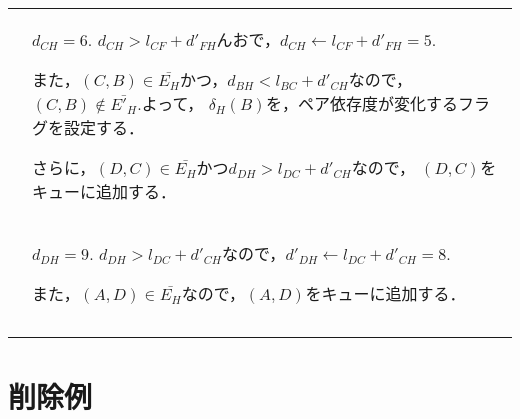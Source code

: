 \begin{tabular}{cp{8cm}}
  \\
  \raisebox{-.8\totalheight}{\fbox{
    \def\svgwidth{.35\linewidth}
    
  }}
  &
  $d_{CH}=6$.
  $d_{CH}\gt l_{CF}+d'_{FH}$んおで，$d_{CH}\gets l_{CF}+d'_{FH}=5$.

  また，$(C,B)\in\bar{E_H}$かつ，$d_{BH}<l_{BC}+d'_{CH}$なので，
  $(C,B)\notin\bar{E'_H}$.よって，
  $\delta_H(B)$を，ペア依存度が変化するフラグを設定する．

  さらに，$(D,C)\in\bar{E_H}$かつ$d_{DH}\gt l_{DC}+d'_{CH}$なので，
  $(D,C)$をキューに追加する．
  \\
  \raisebox{-.8\totalheight}{\fbox{
    \def\svgwidth{.35\linewidth}
    
  }}
  &
  $d_{DH}=9$.
  $d_{DH}>l_{DC}+d'_{CH}$なので，$d'_{DH}\gets l_{DC}+d'_{CH}=8$.

  また，$(A,D)\in\bar{E_H}$なので，$(A,D)$をキューに追加する．
  \\
  \raisebox{-.8\totalheight}{\fbox{
    \def\svgwidth{.35\linewidth}
    
  }}
  &
  \\
  \raisebox{-.8\totalheight}{\fbox{
    \def\svgwidth{.35\linewidth}
    
  }}
  &
\end{tabular}

\newpage

\section{削除例}

